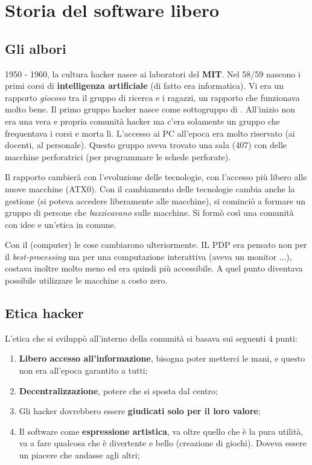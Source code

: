 \section{Storia del software libero}

\subsection{Gli albori}

1950 - 1960, la cultura hacker nasce ai laboratori del \textbf{MIT}. Nel 58/59 nascono i primi corsi di \textbf{intelligenza artificiale} (di fatto era informatica). Vi era un rapporto \textit{giocoso} tra il gruppo di ricerca e i ragazzi, un rapporto che funzionava molto bene. Il primo gruppo hacker nasce come sottogruppo di . All'inizio non era una vera e propria comunità hacker ma c'era solamente un gruppo che frequentava i corsi e morta lì. L'accesso ai PC all'epoca era molto riservato (ai docenti, al personale). Questo gruppo aveva trovato una sala (407) con delle macchine perforatrici (per programmare le schede perforate). 

Il rapporto cambierà con l'evoluzione delle tecnologie, con l'accesso più libero alle nuove macchine (ATX0). Con il cambiamento delle tecnologie cambia anche la gestione (si poteva accedere liberamente alle macchine), si cominciò a formare un gruppo di persone che \textit{bazzicavano} sulle macchine. Si formò così una comunità con idee e un'etica in comune. 

Con il  (computer) le cose cambiarono ulteriormente. IL PDP era pensato non per il \textit{best-processing} ma per una computazione interattiva (aveva un monitor ...), costava inoltre molto meno ed era quindi più accessibile. A quel punto diventava possibile utilizzare le macchine a costo zero.

\subsection{Etica hacker}

L'etica che si sviluppò all'interno della comunità si basava sui seguenti 4 punti:

\begin{enumerate}

\item \textbf{Libero accesso all'informazione}, bisogna poter metterci le mani, e questo non era all'epoca garantito a tutti;
\item \textbf{Decentralizzazione}, potere che si sposta dal centro;
\item Gli hacker dovrebbero essere \textbf{giudicati solo per il loro valore};
\item Il software come \textbf{espressione artistica}, va oltre quello che è la pura utilità, va a fare qualcosa che è divertente e bello (creazione di giochi). Doveva essere un piacere che andasse agli altri;

\end{enumerate}

